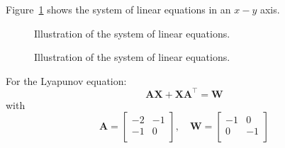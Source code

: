 \documentclass[12pt]{article}
\begin{document}
Figure~\ref{example1} shows the system of linear equations in an $x-y$ axis.

\begin{figure}[h]
    \centering
    
    \caption{Illustration of the system of linear equations.}
    \label{example1}
\end{figure}


\begin{figure}[h]
    \centering
    
    \caption{Illustration of the system of linear equations.}
    \label{example2}
\end{figure}

For the Lyapunov equation:
\begin{equation}
\boldsymbol{A}\boldsymbol{X}+\boldsymbol{X}\boldsymbol{A}^\top=\boldsymbol{W}
\end{equation}
with
\begin{equation}
\boldsymbol{A}=\begin{bmatrix}
-2 & -1 \\
-1 & 0 \\
\end{bmatrix},\quad\boldsymbol{W}=\begin{bmatrix}
-1 & 0 \\
0 & -1 \\
\end{bmatrix}
\end{equation}
\end{document}
